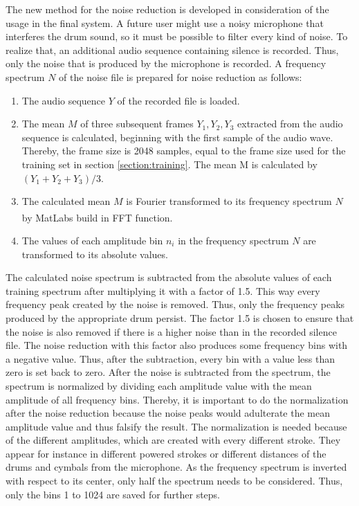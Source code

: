 The new method for the noise reduction is developed in consideration of the usage in the final system. A future user might use a noisy microphone that interferes the drum sound, so it must be possible to filter every kind of noise. To realize that, an additional audio sequence containing silence is recorded. Thus, only the noise that is produced by the microphone is recorded. A frequency spectrum $N$ of the noise file is prepared for noise reduction as follows:

\begin{enumerate}
  \item The audio sequence $Y$ of the recorded file is loaded.
  \item The mean $M$ of three subsequent frames $Y_1, Y_2, Y_3$ extracted from the audio sequence is calculated, beginning with the first sample of the audio wave. Thereby, the frame size is 2048 samples, equal to the frame size used for the training set in section \ref{section:training}. The mean M is calculated by $(Y_1+Y_2+Y_3)/3$.
  \item The calculated mean $M$ is Fourier transformed to its frequency spectrum $N$ by MatLab\textsuperscript{\textregistered}s build in FFT function.
	\item The values of each amplitude bin $n_i$ in the frequency spectrum $N$ are transformed to its absolute values.
\end{enumerate}


The calculated noise spectrum is subtracted from the absolute values of each training spectrum after multiplying it with a factor of 1.5. This way every frequency peak created by the noise is removed. Thus, only the frequency peaks produced by the appropriate drum persist. The factor 1.5 is chosen to ensure that the noise is also removed if there is a higher noise than in the recorded silence file. The noise reduction with this factor also produces some frequency bins with a negative value. Thus, after the subtraction, every bin with a value less than zero is set back to zero. After the noise is subtracted from the spectrum, the spectrum is normalized by dividing each amplitude value with the mean amplitude of all frequency bins. Thereby, it is important to do the normalization after the noise reduction because the noise peaks would adulterate the mean amplitude value and thus falsify the result. The normalization is needed because of the different amplitudes, which are created with every different stroke. They appear for instance in different powered strokes or different distances of the drums and cymbals from the microphone. As the frequency spectrum is inverted with respect to its center, only half the spectrum needs to be considered. Thus, only the bins 1 to 1024 are saved for further steps.

